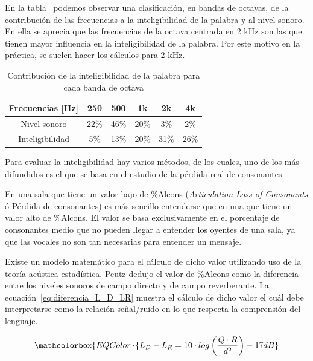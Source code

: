 \par En la tabla~ podemos observar una clasificación, en bandas de octavas, de la contribución de las frecuencias a la inteligibilidad de la palabra y al nivel sonoro. En ella se aprecia que las frecuencias de la octava centrada en 2 kHz son las que tienen mayor influencia en la inteligibilidad de la palabra. Por este motivo en la práctica, se suelen hacer los cálculos para 2 kHz.

\begin{table}[h]
    \centering
    \begin{tabular}{|c|c|c|c|c|c|} \hline
        Frecuencias [Hz] & 250 & 500 & 1k & 2k & 4k  \\ \hline
        Nivel sonoro &22\%& 46\% & 20\% &3\% &2\% \\ \hline
        Inteligibilidad &5\% &13\% &20\% &31\% &26\% \\ \hline
    \end{tabular}
    \caption{Contribución de la inteligibilidad de la palabra para cada banda de octava}
    \label{tab:Contribucion_inteligibilidad_x_banda_de_octava}
\end{table}

\par Para evaluar la inteligibilidad hay varios métodos, de los cuales, uno de los más difundidos es el que se basa en el estudio de la pérdida real de consonantes.

\par En una sala que tiene un valor bajo de \%Alcons (\textit{Articulation Loss of Consonants} ó Pérdida de consonantes) es más sencillo entenderse que en una que tiene un valor alto de \%Alcons. El valor se basa exclusivamente en el porcentaje de consonantes medio que no pueden llegar a entender los oyentes de una sala, ya que las vocales no son tan necesarias para entender un mensaje.

\par Existe un modelo matemático para el cálculo de dicho valor utilizando uso de la teoría acústica estadística. Peutz dedujo el valor de \%Alcons como la diferencia entre los niveles sonoros de campo directo y de campo reverberante. La ecuación~\eqref{eq:diferencia_L_D_LR} muestra el cálculo de dicho valor el cuál debe interpretarse como la relación señal/ruido en lo que respecta la comprensión del lenguaje.

\begin{equation}
   \mathcolorbox{EQColor}{ L_D - L_R = 10 \cdot log \left(\frac{Q \cdot R}{ d^2} \right) - 17dB }
    \label{eq:diferencia_L_D_LR}
\end{equation}

